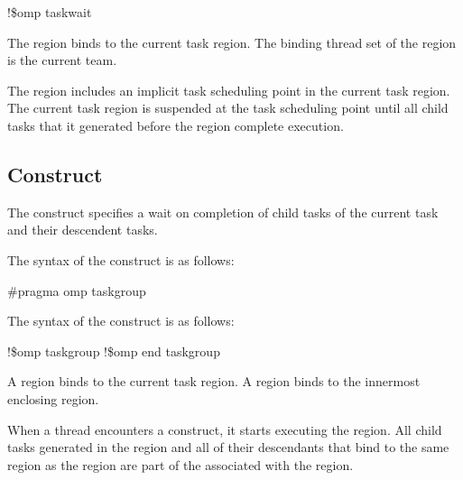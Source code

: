 \begin{boxedcode}
!\$omp taskwait 
\end{boxedcode}
\fortranspecificend

\binding
The  region binds to the current task region. The binding thread set of the 
 region is the current team.

\descr

The  region includes an implicit task scheduling point in the current task 
region. The current task region is suspended at the task scheduling point until all child 
tasks that it generated before the  region complete execution.










\subsection{ Construct}
\label{subsec:taskgroup Construct}
\summary
The  construct specifies a wait on completion of child tasks of the current 
task and their descendent tasks.

\syntax
\ccppspecificstart
The syntax of the  construct is as follows:

\begin{boxedcode}
\#pragma omp taskgroup 
\end{boxedcode}
\ccppspecificend

\fortranspecificstart
The syntax of the  construct is as follows:

\begin{boxedcode}
!\$omp taskgroup
!\$omp end taskgroup
\end{boxedcode}
\fortranspecificend

\binding
A  region binds to the current task region. A  region binds to 
the innermost enclosing  region. 

\descr
When a thread encounters a  construct, it starts executing 
the region. All child tasks generated in the  region and all 
of their descendants that bind to the same  region as the 
 region are part of the  associated with 
the  region.


